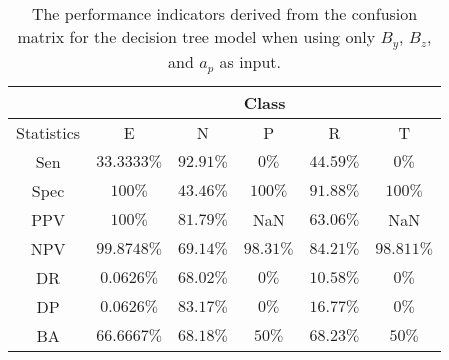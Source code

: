 \begin{table}[!ht]
	\centering
	\begin{tabular}{|c|c|c|c|c|c|}
		\hline
		 & \multicolumn{5}{c|}{Class} \\ \hline
		Statistics & E & N & P & R & T \\ \hline
		Sen & $33.3333\%$ & $92.91\%$ & $0\%$ & $44.59\%$ & $0\%$ \\ \hline
		Spec & $100\%$ & $43.46\%$ & $100\%$ & $91.88\%$ & $100\%$ \\ \hline
		PPV & $100\%$ & $81.79\%$ & NaN & $63.06\%$ & NaN \\ \hline
		NPV & $99.8748\%$ & $69.14\%$ & $98.31\%$ & $84.21\%$ & $98.811\%$ \\ \hline
		DR & $0.0626\%$ & $68.02\%$ & $0\%$ & $10.58\%$ & $0\%$ \\ \hline
		DP & $0.0626\%$ & $83.17\%$ & $0\%$ & $16.77\%$ & $0\%$ \\ \hline
		BA & $66.6667\%$ & $68.18\%$ & $50\%$ & $68.23\%$ & $50\%$ \\ \hline
	\end{tabular}
	\caption{The performance indicators derived from the confusion matrix for the decision tree model when using only $B_{y}$, $B_{z}$, and $a_{p}$ as input.}
	\label{tab:cs:reverse:yzap:C5.0}
\end{table}

